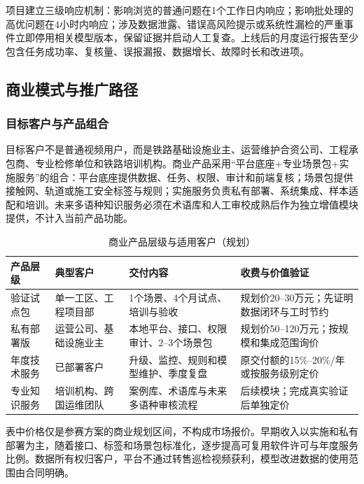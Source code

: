 \documentclass[UTF8,a4paper,zihao=-4]{ctexart}
\begin{document}
项目建立三级响应机制：影响浏览的普通问题在1个工作日内响应；影响批处理的高优问题在4小时内响应；涉及数据泄露、错误高风险提示或系统性漏检的严重事件立即停用相关模型版本，保留证据并启动人工复查。上线后的月度运行报告至少包含任务成功率、复核量、误报漏报、数据增长、故障时长和改进项。

\subsection{商业模式与推广路径}

\subsubsection{目标客户与产品组合}

目标客户不是普通视频用户，而是铁路基础设施业主、运营维护合资公司、工程承包商、专业检修单位和铁路培训机构。商业产品采用“平台底座+专业场景包+实施服务”的组合：平台底座提供数据、任务、权限、审计和前端复核；场景包提供接触网、轨道或施工安全标签与规则；实施服务负责私有部署、系统集成、样本适配和培训。未来多语种知识服务必须在术语库和人工审校成熟后作为独立增值模块提供，不计入当前产品功能。

\begin{table}[H]
\centering
\caption{商业产品层级与适用客户（规划）}
\label{tab:commercial-packages}
\small
\begin{tabularx}{\textwidth}{p{}p{}p{}X}
\toprule
产品层级 & 典型客户 & 交付内容 & 收费与价值验证 \\
\midrule
验证试点包 & 单一工区、工程项目部 & 1个场景、4个月试点、培训与验收 & 规划价20--30万元；先证明数据闭环与工时节约 \\
私有部署版 & 运营公司、基础设施业主 & 本地平台、接口、权限审计、2--3个场景包 & 规划价50--120万元；按规模和集成范围询价 \\
年度技术服务 & 已部署客户 & 升级、监控、规则和模型维护、季度复盘 & 原交付额的15\%--20\%/年或按服务级别定价 \\
专业知识服务 & 培训机构、跨国运维团队 & 案例库、术语库与未来多语种审核流程 & 后续模块；完成真实验证后单独定价 \\
\bottomrule
\end{tabularx}
\end{table}

表中价格仅是参赛方案的商业规划区间，不构成市场报价。早期收入以实施和私有部署为主，随着接口、标签和场景包标准化，逐步提高可复用软件许可与年度服务比例。数据所有权归客户，平台不通过转售巡检视频获利，模型改进数据的使用范围由合同明确。
\end{document}

